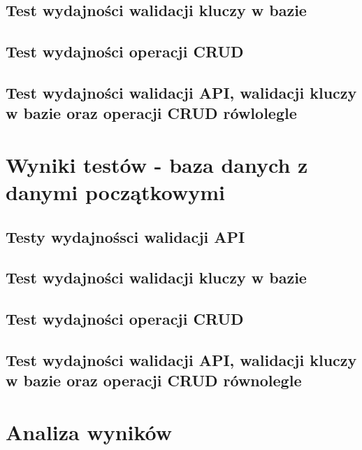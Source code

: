 \newpage
\subsection{Test wydajności walidacji kluczy w bazie}


\clearpage

\newpage
\subsection{Test wydajności operacji CRUD}


\clearpage

\newpage
\subsection{Test wydajności walidacji API, walidacji kluczy w bazie oraz operacji CRUD rówlolegle }


\clearpage

\newpage
\section{Wyniki testów - baza danych z danymi początkowymi}
\subsection{Testy wydajnośsci walidacji API}


\clearpage

\newpage
\subsection{Test wydajności walidacji kluczy w bazie}


\clearpage

\newpage
\subsection{Test wydajności operacji CRUD}


\clearpage


\newpage
\subsection{Test wydajności walidacji API, walidacji kluczy w bazie oraz operacji CRUD równolegle }


\clearpage

\newpage
\section{Analiza wyników}
